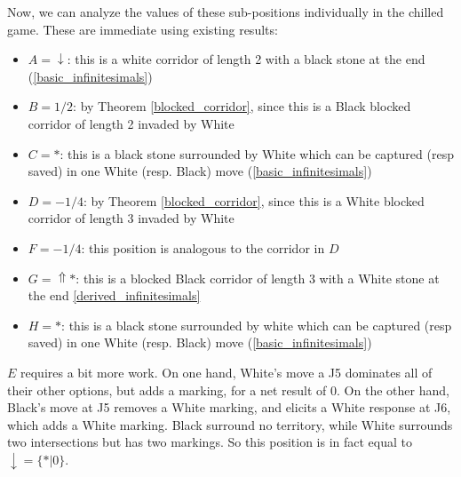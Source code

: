 \documentclass[../math194_paper.tex]{subfiles}
\begin{document}
Now, we can analyze the values of these sub-positions individually in the chilled game. These are immediate using 
existing results:
\begin{itemize}
    \item $A = \downarrow$: this is a white corridor of length 2 with a black stone at the end 
    (\ref{basic_infinitesimals})
    \item $B = 1/2$: by Theorem \ref{blocked_corridor}, since this is a Black blocked corridor of length 2 invaded by White
    \item $C = *$: this is a black stone surrounded by White which can be captured (resp saved) in one 
    White (resp. Black) move (\ref{basic_infinitesimals})
    \item $D = -1/4$: by Theorem \ref{blocked_corridor}, since this is a White blocked corridor of length 3 invaded by White
    \item $F = -1/4$: this position is analogous to the corridor in $D$ 
    \item $G = \Uparrow *$: this is a blocked Black corridor of length 3 with a White stone at the end 
    \ref{derived_infinitesimals}
    \item $H = *$:  this is a black stone surrounded by white which can be captured (resp saved) in one 
    White (resp. Black) move (\ref{basic_infinitesimals})
\end{itemize}
$E$ requires a bit more work. On one hand, White's move a J5 dominates all of their other options, but 
adds a marking, for a net result of 0. 
On the other hand, Black's move at J5 removes a White marking, and elicits a White response at 
J6, which adds a White marking. Black surround no territory, while White surrounds two intersections 
but has two markings. So this position is in fact equal to $\downarrow = \{*|0\}$.  \\
\end{document}
